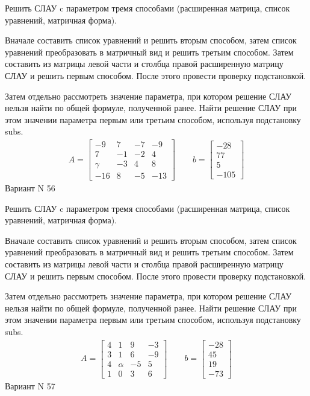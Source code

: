 \documentclass[11pt]{report}
\begin{document}
Решить СЛАУ c параметром тремя способами (расширенная матрица, список уравнений, матричная форма).

Вначале составить список уравнений и решить вторым способом,
затем список уравнений преобразовать в матричный вид и решить третьим способом.
Затем составить из матрицы левой части и столбца правой расширенную матрицу СЛАУ и решить первым способом.
После этого провести проверку подстановкой.

Затем отдельно рассмотреть значение параметра, при котором решение СЛАУ нельзя найти по общей формуле,
полученной ранее.
Найти решение СЛАУ при этом значении параметра первым или третьим способом, используя подстановку subs.
\begin{align*}
    A = \left[\begin{matrix}-9 & 7 & -7 & -9\\7 & -1 & -2 & 4\\\gamma & -3 & 4 & 8\\-16 & 8 & -5 & -13\end{matrix}\right]
\qquad b = \left[\begin{matrix}-28\\77\\5\\-105\end{matrix}\right]
\end{align*}
\newpage
Вариант N 56


Решить СЛАУ c параметром тремя способами (расширенная матрица, список уравнений, матричная форма).

Вначале составить список уравнений и решить вторым способом,
затем список уравнений преобразовать в матричный вид и решить третьим способом.
Затем составить из матрицы левой части и столбца правой расширенную матрицу СЛАУ и решить первым способом.
После этого провести проверку подстановкой.

Затем отдельно рассмотреть значение параметра, при котором решение СЛАУ нельзя найти по общей формуле,
полученной ранее.
Найти решение СЛАУ при этом значении параметра первым или третьим способом, используя подстановку subs.
\begin{align*}
    A = \left[\begin{matrix}4 & 1 & 9 & -3\\3 & 1 & 6 & -9\\4 & \alpha & -5 & 5\\1 & 0 & 3 & 6\end{matrix}\right]
\qquad b = \left[\begin{matrix}-28\\45\\19\\-73\end{matrix}\right]
\end{align*}
\newpage
Вариант N 57
\end{document}
